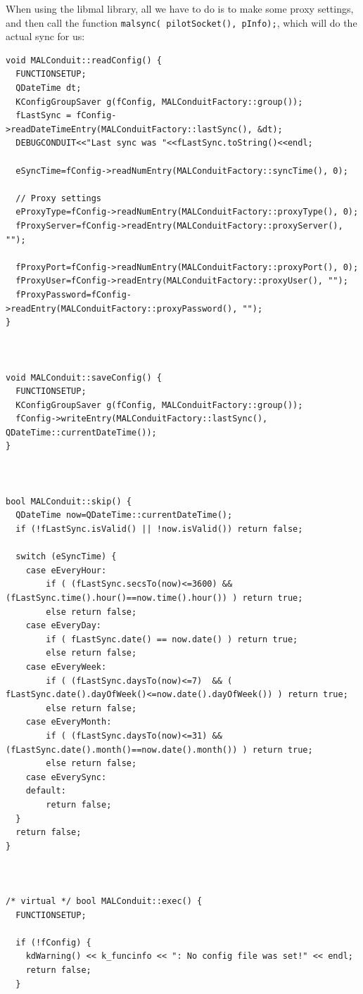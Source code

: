 \documentclass[10pt,a4paper]{article}
\begin{document}
When using the libmal library, all we have to do is to make some proxy settings, and then call the function \texttt{malsync( pilotSocket(), pInfo);}, which will do the actual sync for us:
{\footnotesize
\begin{verbatim}
void MALConduit::readConfig() {
  FUNCTIONSETUP;
  QDateTime dt;
  KConfigGroupSaver g(fConfig, MALConduitFactory::group());
  fLastSync = fConfig->readDateTimeEntry(MALConduitFactory::lastSync(), &dt);
  DEBUGCONDUIT<<"Last sync was "<<fLastSync.toString()<<endl;

  eSyncTime=fConfig->readNumEntry(MALConduitFactory::syncTime(), 0);
  
  // Proxy settings
  eProxyType=fConfig->readNumEntry(MALConduitFactory::proxyType(), 0);
  fProxyServer=fConfig->readEntry(MALConduitFactory::proxyServer(), "");

  fProxyPort=fConfig->readNumEntry(MALConduitFactory::proxyPort(), 0);
  fProxyUser=fConfig->readEntry(MALConduitFactory::proxyUser(), "");
  fProxyPassword=fConfig->readEntry(MALConduitFactory::proxyPassword(), "");
}



void MALConduit::saveConfig() {
  FUNCTIONSETUP;
  KConfigGroupSaver g(fConfig, MALConduitFactory::group());
  fConfig->writeEntry(MALConduitFactory::lastSync(), QDateTime::currentDateTime());
}



bool MALConduit::skip() {
  QDateTime now=QDateTime::currentDateTime();
  if (!fLastSync.isValid() || !now.isValid()) return false;

  switch (eSyncTime) {
    case eEveryHour:
        if ( (fLastSync.secsTo(now)<=3600) && (fLastSync.time().hour()==now.time().hour()) ) return true;
        else return false;
    case eEveryDay:
        if ( fLastSync.date() == now.date() ) return true;
        else return false;
    case eEveryWeek:
        if ( (fLastSync.daysTo(now)<=7)  && ( fLastSync.date().dayOfWeek()<=now.date().dayOfWeek()) ) return true;
        else return false;
    case eEveryMonth:
        if ( (fLastSync.daysTo(now)<=31) && (fLastSync.date().month()==now.date().month()) ) return true;
        else return false;
    case eEverySync:
    default:
        return false;
  }
  return false;
}



/* virtual */ bool MALConduit::exec() {
  FUNCTIONSETUP;

  if (!fConfig) {
    kdWarning() << k_funcinfo << ": No config file was set!" << endl;
    return false;
  }


\end{verbatim}}
\end{document}
